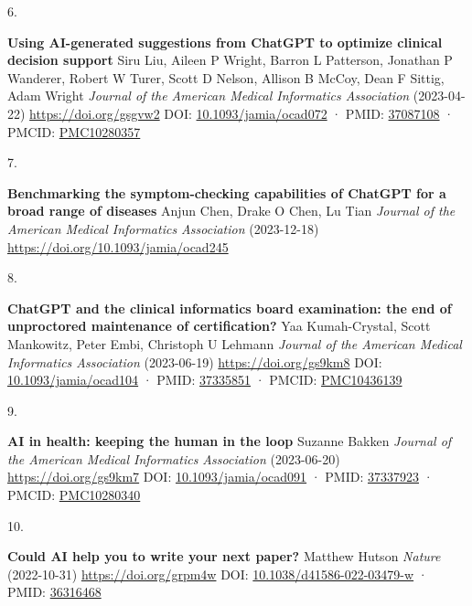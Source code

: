 \documentclass[
]{article}
\newlength{\cslhangindent}
\newlength{\csllabelwidth}
\newlength{\cslentryspacingunit} %
\newenvironment{CSLReferences}[2] %
 {%
  \setlength{\parindent}{0pt}
  \ifodd #1
  \let\oldpar\par
  \def\par{\hangindent=\cslhangindent\oldpar}
  \fi
  \setlength{\parskip}{#2\cslentryspacingunit}
 }%
 {}
\newcommand{\CSLBlock}[1]{#1\hfill\break}
\newcommand{\CSLLeftMargin}[1]{\parbox[t]{\csllabelwidth}{#1}}
\newcommand{\CSLRightInline}[1]{\parbox[t]{\linewidth - \csllabelwidth}{#1}\break}
\begin{document}
\begin{CSLReferences}{0}{0}
\leavevmode{}%
\CSLLeftMargin{6. }%
\CSLRightInline{\textbf{Using AI-generated suggestions from ChatGPT to optimize clinical decision support}
\CSLBlock{Siru Liu, Aileen P Wright, Barron L Patterson, Jonathan P Wanderer, Robert W Turer, Scott D Nelson, Allison B McCoy, Dean F Sittig, Adam Wright} \emph{Journal of the American Medical Informatics Association} (2023-04-22) \url{https://doi.org/gsgvw2}
\CSLBlock{DOI: \href{https://doi.org/10.1093/jamia/ocad072}{10.1093/jamia/ocad072} · PMID: \href{https://www.ncbi.nlm.nih.gov/pubmed/37087108}{37087108} · PMCID: \href{https://www.ncbi.nlm.nih.gov/pmc/articles/PMC10280357}{PMC10280357}}}

\leavevmode{}%
\CSLLeftMargin{7. }%
\CSLRightInline{\textbf{Benchmarking the symptom-checking capabilities of ChatGPT for a broad range of diseases}
\CSLBlock{Anjun Chen, Drake O Chen, Lu Tian} \emph{Journal of the American Medical Informatics Association} (2023-12-18) \url{https://doi.org/10.1093/jamia/ocad245}}

\leavevmode{}%
\CSLLeftMargin{8. }%
\CSLRightInline{\textbf{ChatGPT and the clinical informatics board examination: the end of unproctored maintenance of certification?}
\CSLBlock{Yaa Kumah-Crystal, Scott Mankowitz, Peter Embi, Christoph U Lehmann} \emph{Journal of the American Medical Informatics Association} (2023-06-19) \url{https://doi.org/gs9km8}
\CSLBlock{DOI: \href{https://doi.org/10.1093/jamia/ocad104}{10.1093/jamia/ocad104} · PMID: \href{https://www.ncbi.nlm.nih.gov/pubmed/37335851}{37335851} · PMCID: \href{https://www.ncbi.nlm.nih.gov/pmc/articles/PMC10436139}{PMC10436139}}}

\leavevmode{}%
\CSLLeftMargin{9. }%
\CSLRightInline{\textbf{AI in health: keeping the human in the loop}
\CSLBlock{Suzanne Bakken} \emph{Journal of the American Medical Informatics Association} (2023-06-20) \url{https://doi.org/gs9km7}
\CSLBlock{DOI: \href{https://doi.org/10.1093/jamia/ocad091}{10.1093/jamia/ocad091} · PMID: \href{https://www.ncbi.nlm.nih.gov/pubmed/37337923}{37337923} · PMCID: \href{https://www.ncbi.nlm.nih.gov/pmc/articles/PMC10280340}{PMC10280340}}}

\leavevmode{}%
\CSLLeftMargin{10. }%
\CSLRightInline{\textbf{Could AI help you to write your next paper?}
\CSLBlock{Matthew Hutson} \emph{Nature} (2022-10-31) \url{https://doi.org/grpm4w}
\CSLBlock{DOI: \href{https://doi.org/10.1038/d41586-022-03479-w}{10.1038/d41586-022-03479-w} · PMID: \href{https://www.ncbi.nlm.nih.gov/pubmed/36316468}{36316468}}}


\end{CSLReferences}
\end{document}
